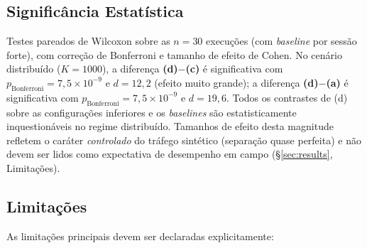 \documentclass[preprint,12pt]{elsarticle}
\begin{document}
\subsection{Significância Estatística}

Testes pareados de Wilcoxon sobre as $n = 30$ execuções (com \emph{baseline} por sessão forte), com correção de Bonferroni e tamanho de efeito de Cohen. No cenário distribuído ($K = 1000$), a diferença \textbf{(d)$-$(c)} é significativa com $p_{\text{Bonferroni}} = 7{,}5 \times 10^{-9}$ e $d = 12{,}2$ (efeito muito grande); a diferença \textbf{(d)$-$(a)} é significativa com $p_{\text{Bonferroni}} = 7{,}5 \times 10^{-9}$ e $d = 19{,}6$. Todos os contrastes de (d) sobre as configurações inferiores e os \emph{baselines} são estatisticamente inquestionáveis no regime distribuído. Tamanhos de efeito desta magnitude refletem o caráter \emph{controlado} do tráfego sintético (separação quase perfeita) e não devem ser lidos como expectativa de desempenho em campo (§\ref{sec:results}, Limitações).

\subsection{Limitações}

As limitações principais devem ser declaradas explicitamente:
\end{document}
